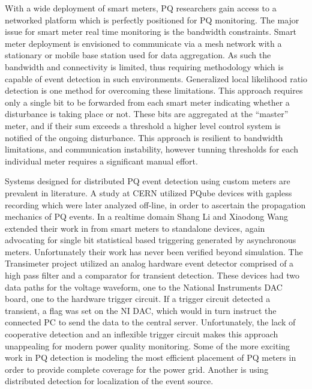With a wide deployment of smart meters, PQ researchers gain access to a networked platform which is perfectly positioned for PQ monitoring.\cite{hoglund2012using} The major issue for smart meter real time monitoring is the bandwidth constraints. Smart meter deployment is envisioned to communicate via a mesh network with a stationary or mobile base station used for data aggregation. As such the bandwidth and connectivity is limited, thus requiring methodology which is capable of event detection in such environments. Generalized local likelihood ratio detection is one method for overcoming these limitations. This approach requires only a single bit to be forwarded from each smart meter indicating whether a disturbance is taking place or not. These bits are aggregated at the ``master'' meter, and if their sum exceeds a threshold a higher level control system is notified of the ongoing disturbance.\cite{li2016cooperative} This approach is resilient to bandwidth limitations, and communication instability, however tunning thresholds for each individual meter requires a significant manual effort.

Systems designed for distributed PQ event detection using custom meters are prevalent in literature. A study at CERN utilized PQube devices with gapless recording which were later analyzed off-line, in order to ascertain the propagation mechanics of PQ events.\cite{kahle2016power} In a realtime domain Shang Li and Xiaodong Wang extended their work in \cite{li2016cooperative} from smart meters to standalone devices, again advocating for single bit statistical based triggering generated by asynchronous meters.\cite{li2013monitoring} Unfortunately their work has never been verified beyond simulation. The Transimeter project utilized an analog hardware event detector comprised of a high pass filter and a comparator for transient detection. These devices had two data paths for the voltage waveform, one to the National Instruments DAC board, one to the hardware trigger circuit. If a trigger circuit detected a transient, a flag was set on the NI DAC, which would in turn instruct the connected PC to send the data to the central server.\cite{daponte2004transientmeter} Unfortunately, the lack of cooperative detection and an inflexible trigger circuit makes this approach unappealing for modern power quality monitoring. Some of the more exciting work in PQ detection is modeling the most efficient placement of PQ meters in order to provide complete coverage for the power grid. \cite{won2006new} Another is using distributed detection for localization of the event source.\cite{parsons1998direction} \cite{polajvzer2017evaluation}

